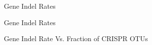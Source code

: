 \documentclass[dvipsnames]{beamer}
\begin{document}
\begin{frame}[fragile]{Gene Indel Rates}
    \begin{figure}[htb!]
    \end{figure}
\end{frame}
\begin{frame}[fragile]{Gene Indel Rates}
    \begin{figure}[htb!]
    \end{figure}
\end{frame}
\begin{frame}[fragile]{Gene Indel Rate Vs. Fraction of CRISPR OTUs}
    \begin{figure}[htb!]
    \end{figure}
\end{frame}
\end{document}
